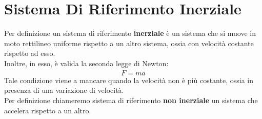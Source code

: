 \documentclass{article}
\begin{document}
\newpage
\section{Sistema Di Riferimento Inerziale}
Per definizione un sistema di riferimento \textbf{inerziale} è un sistema che si muove in moto rettilineo uniforme rispetto a un altro sistema, ossia con velocità costante rispetto ad esso.\\
Inoltre, in esso, è valida la seconda legge di Newton:
\begin{equation}
    \bar{F}=m\bar{a}
\end{equation}
Tale condizione viene a mancare quando la velocità non è più costante, ossia in presenza di una variazione di velocità.\\
Per definizione chiameremo sistema di riferimento \textbf{non inerziale} un sistema che accelera rispetto a un altro.
\end{document}
